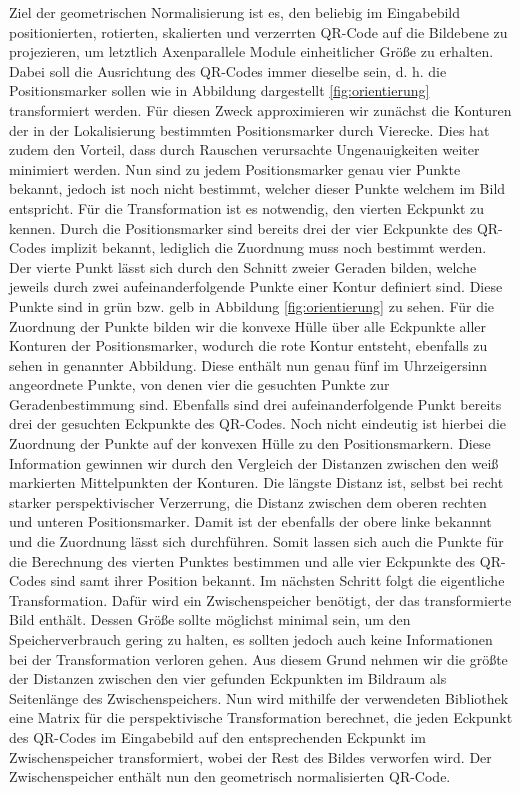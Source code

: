 \documentclass[a4paper, oneside, 12pt]{article}
\begin{document}
Ziel der geometrischen Normalisierung ist es, den beliebig im Eingabebild positionierten, rotierten, skalierten und verzerrten QR-Code auf die Bildebene zu projezieren, um letztlich Axenparallele Module einheitlicher Größe zu erhalten.
Dabei soll die Ausrichtung des QR-Codes immer dieselbe sein, d. h. die Positionsmarker sollen wie in Abbildung dargestellt \ref{fig:orientierung} transformiert werden.
Für diesen Zweck approximieren wir zunächst die Konturen der in der Lokalisierung bestimmten Positionsmarker durch Vierecke. Dies hat zudem den Vorteil, dass durch Rauschen verursachte Ungenauigkeiten weiter minimiert werden. Nun sind zu jedem Positionsmarker genau vier Punkte bekannt, jedoch ist noch nicht bestimmt, welcher dieser Punkte welchem im Bild entspricht. Für die Transformation ist es notwendig, den vierten Eckpunkt zu kennen. Durch die Positionsmarker sind bereits drei der vier Eckpunkte des QR-Codes implizit bekannt, lediglich die Zuordnung muss noch bestimmt werden. Der vierte Punkt lässt sich durch den Schnitt zweier Geraden bilden, welche jeweils durch zwei aufeinanderfolgende Punkte einer Kontur definiert sind. Diese Punkte sind in grün bzw. gelb in Abbildung \ref{fig:orientierung} zu sehen.
Für die Zuordnung der Punkte bilden wir die konvexe Hülle über alle Eckpunkte aller Konturen der Positionsmarker, wodurch die rote Kontur entsteht, ebenfalls zu sehen in genannter Abbildung. Diese enthält nun genau fünf im Uhrzeigersinn angeordnete Punkte, von denen vier die gesuchten Punkte zur Geradenbestimmung sind. Ebenfalls sind drei aufeinanderfolgende Punkt bereits drei der gesuchten Eckpunkte des QR-Codes. Noch nicht eindeutig ist hierbei die Zuordnung der Punkte auf der konvexen Hülle zu den Positionsmarkern. Diese Information gewinnen wir durch den Vergleich der Distanzen zwischen den weiß markierten Mittelpunkten der Konturen. Die längste Distanz ist, selbst bei recht starker perspektivischer Verzerrung, die Distanz zwischen dem oberen rechten und unteren Positionsmarker. Damit ist der ebenfalls der obere linke bekannnt und die Zuordnung lässt sich durchführen. Somit lassen sich auch die Punkte für die Berechnung des vierten Punktes bestimmen und alle vier Eckpunkte des QR-Codes sind samt ihrer Position bekannt.
Im nächsten Schritt folgt die eigentliche Transformation.
Dafür wird ein Zwischenspeicher benötigt, der das transformierte Bild enthält. Dessen Größe sollte möglichst minimal sein, um den Speicherverbrauch gering zu halten, es sollten jedoch auch keine Informationen bei der Transformation verloren gehen. Aus diesem Grund nehmen wir die größte der Distanzen zwischen den vier gefunden Eckpunkten im Bildraum als Seitenlänge des Zwischenspeichers.
Nun wird mithilfe der verwendeten Bibliothek eine Matrix für die perspektivische Transformation berechnet, die jeden Eckpunkt des QR-Codes im Eingabebild auf den entsprechenden Eckpunkt im Zwischenspeicher transformiert, wobei der Rest des Bildes verworfen wird.
Der Zwischenspeicher enthält nun den geometrisch normalisierten QR-Code.
\end{document}
